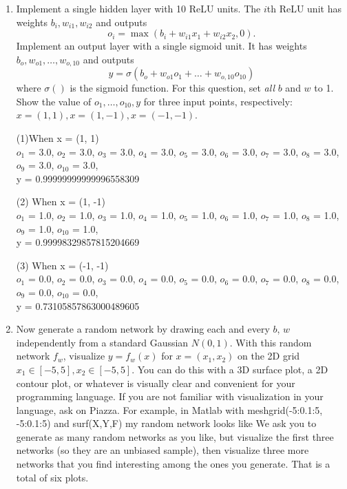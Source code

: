 \documentclass[a4paper]{article}
\theoremstyle{definition}
\def\y{\mathbf y}
\newenvironment{soln}{
    \leavevmode\color{blue}\ignorespaces
}{}
\begin{document}
\begin{enumerate}
\item Implement a single hidden layer with 10 ReLU units.
The $i$th ReLU unit has weights $b_i, w_{i1}, w_{i2}$ and outputs 
$$o_i =\max( b_i + w_{i1} x_1 + w_{i2} x_2, 0).$$
Implement an output layer with a single sigmoid unit.
It has weights $b_o, w_{o1}, \ldots, w_{o,10}$ and outputs
$$y =\sigma( b_o + w_{o1} o_1 + \ldots + w_{o,10} o_{10})$$
where $\sigma()$ is the sigmoid function.
For this question, set \emph{all} $b$ and $w$ to 1.
Show the value of $o_1, \ldots, o_{10}, y$ for three input points, respectively: $x=(1,1), x=(1, -1), x=(-1,-1)$.

\begin{soln}
(1)When x = (1, 1)
\\$o_1$ = 3.0, $o_2$ = 3.0, $o_3$ = 3.0, $o_4$ = 3.0, $o_5$ = 3.0, $o_6$ = 3.0, $o_7$ = 3.0, $o_8$ = 3.0, $o_9$ = 3.0, $o_{10}$ = 3.0, 
\\y = 0.99999999999996558309

(2) When x = (1, -1)
\\$o_1$ = 1.0, $o_2$ = 1.0, $o_3$ = 1.0, $o_4$ = 1.0, $o_5$ = 1.0, $o_6$ = 1.0, $o_7$ = 1.0, $o_8$ = 1.0, $o_9$ = 1.0, $o_{10}$ = 1.0, 
\\y = 0.99998329857815204669

(3) When x = (-1, -1)
\\$o_1$ = 0.0, $o_2$ = 0.0, $o_3$ = 0.0, $o_4$ = 0.0, $o_5$ = 0.0, $o_6$ = 0.0, $o_7$ = 0.0, $o_8$ = 0.0, $o_9$ = 0.0, $o_{10}$ = 0.0, 
\\y = 0.73105857863000489605

\end{soln}



\item Now generate a random network by drawing each and every $b$, $w$ independently from a standard Gaussian $N(0,1)$.
With this random network $f_w$, visualize $y=f_w(x)$ for $x=(x_1,x_2)$ on the 2D grid $x_1 \in [-5,5], x_2 \in [-5, 5]$.
You can do this with a 3D surface plot, a 2D contour plot, or whatever is visually clear and convenient for your programming language.
If you are not familiar with visualization in your language, ask on Piazza.
For example, in Matlab with meshgrid(-5:0.1:5, -5:0.1:5) and surf(X,Y,F) my random network looks like
We ask you to generate as many random networks as you like, but visualize the first three networks (so they are an unbiased sample), then visualize three more networks that you find interesting among the ones you generate.
That is a total of six plots.
\begin{soln}



\end{soln}
\end{enumerate}
\end{document}
